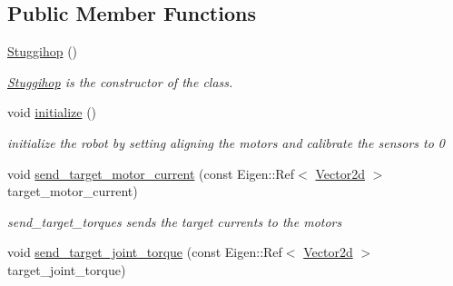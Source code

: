 \subsection*{Public Member Functions}
\begin{DoxyCompactItemize}
\item 
\hyperlink{classblmc__robots_1_1Stuggihop_aea7781a2eb5a410ca8ab2bbfe425cb6a}{Stuggihop} ()
\begin{DoxyCompactList}\small\item\em \hyperlink{classblmc__robots_1_1Stuggihop}{Stuggihop} is the constructor of the class. \end{DoxyCompactList}\item 
void \hyperlink{classblmc__robots_1_1Stuggihop_a2a272c1cb428a2a7250b23d7ca40c894}{initialize} ()\hypertarget{classblmc__robots_1_1Stuggihop_a2a272c1cb428a2a7250b23d7ca40c894}{}\label{classblmc__robots_1_1Stuggihop_a2a272c1cb428a2a7250b23d7ca40c894}

\begin{DoxyCompactList}\small\item\em initialize the robot by setting aligning the motors and calibrate the sensors to 0 \end{DoxyCompactList}\item 
void \hyperlink{classblmc__robots_1_1Stuggihop_ab3c118885810575b36c49432a2a5eca5}{send\+\_\+target\+\_\+motor\+\_\+current} (const Eigen\+::\+Ref$<$ \hyperlink{common__header_8hpp_acb6916bc8c9fe9d98c484fd4cc201447}{Vector2d} $>$ target\+\_\+motor\+\_\+current)\hypertarget{classblmc__robots_1_1Stuggihop_ab3c118885810575b36c49432a2a5eca5}{}\label{classblmc__robots_1_1Stuggihop_ab3c118885810575b36c49432a2a5eca5}

\begin{DoxyCompactList}\small\item\em send\+\_\+target\+\_\+torques sends the target currents to the motors \end{DoxyCompactList}\item 
void \hyperlink{classblmc__robots_1_1Stuggihop_ac8bae7764c409c8312408ea8adb1165f}{send\+\_\+target\+\_\+joint\+\_\+torque} (const Eigen\+::\+Ref$<$ \hyperlink{common__header_8hpp_acb6916bc8c9fe9d98c484fd4cc201447}{Vector2d} $>$ target\+\_\+joint\+\_\+torque)\hypertarget{classblmc__robots_1_1Stuggihop_ac8bae7764c409c8312408ea8adb1165f}{}\label{classblmc__robots_1_1Stuggihop_ac8bae7764c409c8312408ea8adb1165f}


\end{DoxyCompactItemize}
